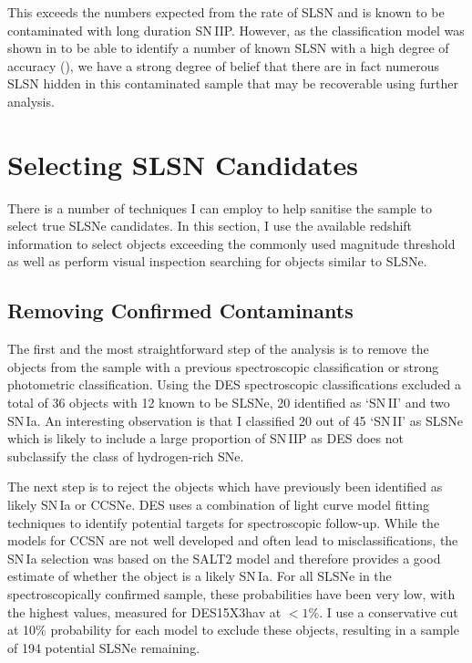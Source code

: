 This exceeds the numbers expected from the rate of SLSN and is known to be contaminated with long duration SN\,IIP. However, as the classification model was shown in  to be able to identify a number of known SLSN with a high degree of accuracy (), we have a strong degree of belief that there are in fact numerous SLSN hidden in this contaminated sample that may be recoverable using further analysis.

\section{Selecting SLSN Candidates}
There is a number of techniques I can employ to help sanitise the sample to select true SLSNe candidates. In this section, I use the available redshift information to select objects exceeding the commonly used magnitude threshold as well as perform visual inspection searching for objects similar to SLSNe.

\subsection{Removing Confirmed Contaminants}
The first and the most straightforward step of the analysis is to remove the objects from the sample with a previous spectroscopic classification or strong photometric classification. Using the DES spectroscopic classifications excluded a total of 36 objects with 12 known to be SLSNe, 20 identified as `SN\,II' and two SN\,Ia. An interesting observation is that I classified 20 out of 45 `SN\,II' as SLSNe which is likely to include a large proportion of SN\,IIP as DES does not subclassify the class of hydrogen-rich SNe.

The next step is to reject the objects which have previously been identified as likely SN\,Ia or CCSNe. DES uses a combination of light curve model fitting techniques to identify potential targets for spectroscopic follow-up. While the models for CCSN are not well developed and often lead to misclassifications, the SN\,Ia selection was based on the SALT2 model and therefore provides a good estimate of whether the object is a likely SN\,Ia. For all SLSNe in the spectroscopically confirmed sample, these probabilities have been very low, with the highest values, measured for DES15X3hav at $<1$\%. I use a conservative cut at 10\% probability for each model to exclude these objects, resulting in a sample of 194 potential SLSNe remaining.

